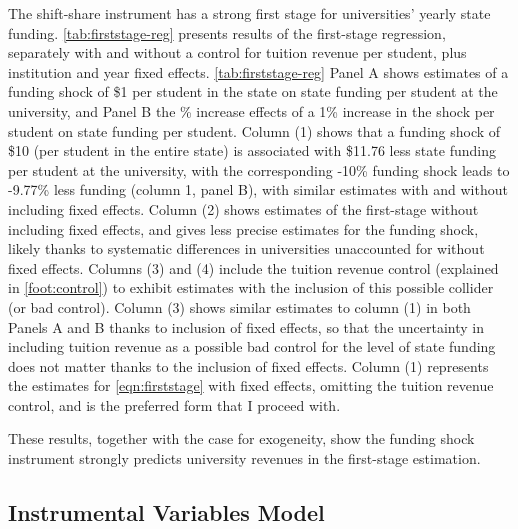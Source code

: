 The shift-share instrument has a strong first stage for universities' yearly state funding.
\autoref{tab:firststage-reg} presents results of the first-stage regression, separately with and without a control for tuition revenue per student, plus institution and year fixed effects.
\autoref{tab:firststage-reg} Panel A shows estimates of a funding shock of \$1 per student in the state on state funding per student at the university, and Panel B the \% increase effects of a 1\% increase in the shock per student on state funding per student.
Column (1) shows that a funding shock of \$10 (per student in the entire state) is associated with \$11.76 less state funding per student at the university, with the corresponding -10\% funding shock leads to -9.77\%
less funding (column 1, panel B), with similar estimates with and without including fixed effects.
Column (2) shows estimates of the first-stage without including fixed effects, and gives less precise estimates for the funding shock, likely thanks to systematic differences in universities unaccounted for without fixed effects.
Columns (3) and (4) include the tuition revenue control (explained in \autoref{foot:control}) to exhibit estimates with the inclusion of this possible collider (or bad control).
Column (3) shows similar estimates to column (1) in both Panels A and B thanks to inclusion of fixed effects, so that the uncertainty in including tuition revenue as a possible bad control for the level of state funding does not matter thanks to the inclusion of fixed effects.
Column (1) represents the estimates for \autoref{eqn:firststage} with fixed effects, omitting the tuition revenue control, and is the preferred form that I proceed with.

These results, together with the case for exogeneity, show the funding shock instrument strongly predicts university revenues in the first-stage estimation.


\subsection{Instrumental Variables Model}
\label{sec:iv-model-uni}

